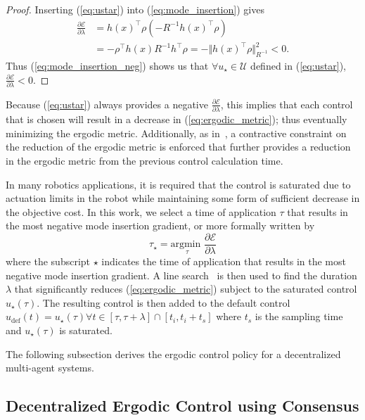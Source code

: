 \documentclass[letterpaper, 10 pt, conference]{ieeeconf}  %
\begin{document}
\begin{proof}
Inserting (\ref{eq:ustar}) into (\ref{eq:mode_insertion}) gives
\begin{align}\label{eq:mode_insertion_neg}
\frac{\partial \mathcal{E}}{\partial \lambda} &= h(x)^\top\rho \left(-R^{-1} h(x)^\top\rho \right) \nonumber \\
& = -\rho^\top h(x)R^{-1}h^\top\rho = - \Vert h(x)^\top\rho \Vert_{R^{-1}}^2 < 0.
\end{align}
Thus (\ref{eq:mode_insertion_neg}) shows us that $\forall u_\star \in \mathcal{U}$ defined in (\ref{eq:ustar}), $\frac{\partial \mathcal{E}}{\partial \lambda}<0$.
\end{proof}
Because (\ref{eq:ustar}) always provides a negative $\frac{\partial \mathcal{E}}{\partial \lambda}$, this implies that each control that is chosen will result in a decrease in (\ref{eq:ergodic_metric}); thus eventually minimizing the ergodic metric.
Additionally, as in~\cite{mavrommatiTRO2017realTime}, a contractive constraint on the reduction of the ergodic metric is enforced that further provides a reduction in the ergodic metric from the previous control calculation time.

In many robotics applications, it is required that the control is saturated due to actuation limits in the robot while maintaining some form of sufficient decrease in the objective cost. 
In this work, we select a time of application $\tau$ that results in the most negative mode insertion gradient, or more formally written by
\begin{equation*}
\tau_\star= \underset{\tau}{\text{argmin }} \frac{\partial \mathcal{E}}{\partial \lambda}
\end{equation*}
where the subscript $\star$ indicates the time of application that results in the most negative mode insertion gradient.
A line search~\cite{armijo1966minimization} is then used to find the duration $\lambda$ that significantly reduces (\ref{eq:ergodic_metric}) subject to the saturated control $u_\star(\tau)$.
The resulting control is then added to the default control $u_\text{def}(t) = u_\star(\tau) \forall t \in \left[ \tau, \tau+\lambda \right] \cap \left[ t_i, t_i+t_s\right]$ where $t_s$ is the sampling time and $u_\star(\tau)$ is saturated.

The following subsection derives the ergodic control policy for a decentralized multi-agent systems.

\subsection{Decentralized Ergodic Control using Consensus}
\label{subsec:decentralized-ergodic-control-using-consensus}
\end{document}

